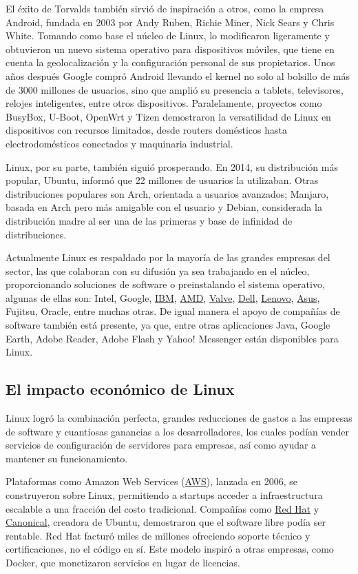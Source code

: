 \documentclass[a4paper,12pt]{article}
\begin{document}
El éxito de Torvalds también sirvió de inspiración a otros, como la empresa
Android, fundada en 2003 por Andy Ruben, Richie Miner, Nick Sears y Chris White.
Tomando como base el núcleo de Linux, lo modificaron ligeramente y obtuvieron un
nuevo sistema operativo para dispositivos móviles, que tiene en cuenta la
geolocalización y la configuración personal de sus propietarios. Unos años 
después Google compró Android llevando el kernel no solo al bolsillo de más de
3000 millones de usuarios, sino que amplió su presencia a tablets, televisores,
relojes inteligentes, entre otros dispositivos. Paralelamente, proyectos como
BusyBox, U-Boot, OpenWrt y Tizen demostraron la versatilidad de Linux en
dispositivos con recursos limitados, desde routers domésticos hasta 
electrodomésticos conectados y maquinaria industrial.

Linux, por su parte, también siguió prosperando. En 2014, su distribución más
popular, Ubuntu, informó que 22 millones de usuarios la utilizaban. Otras
distribuciones populares son Arch, orientada a usuarios avanzados; Manjaro,
basada en Arch pero más amigable con el usuario y Debian, considerada la 
distribución madre al ser una de las primeras y base de infinidad de
distribuciones. 

Actualmente Linux es respaldado por la mayoría de las grandes empresas del
sector, las que colaboran con su difusión ya sea trabajando en el núcleo,
proporcionando soluciones de software o preinstalando el sistema operativo,
algunas de ellas son: Intel, Google, \hyperlink{ibm}{IBM}, \hyperlink{amd}{AMD}, \hyperlink{valve}{Valve}, \hyperlink{dell}{Dell}, \hyperlink{lenovo}{Lenovo}, \hyperlink{asus}{Asus},
Fujitsu, Oracle, entre muchas otras. De igual manera el apoyo de compañías de
software también está presente, ya que, entre otras aplicaciones Java, Google
Earth, Adobe Reader, Adobe Flash y Yahoo! Messenger están disponibles para
Linux.  

\subsection{El impacto económico de Linux}

Linux logró la combinación perfecta, grandes reducciones de gastos a las
empresas de software y cuantiosas ganancias a los desarrolladores, los cuales
podían vender servicios de configuración de servidores para empresas, así como
ayudar a mantener su funcionamiento. 

Plataformas como Amazon Web Services (\hyperlink{aws}{AWS}), lanzada en 2006, se construyeron
sobre Linux, permitiendo a startups acceder a infraestructura escalable a una
fracción del costo tradicional. Compañías como \hyperlink{redhat}{Red Hat} y \hyperlink{canonical}{Canonical}, creadora de
Ubuntu, demostraron que el software libre podía ser rentable. Red Hat facturó
miles de millones ofreciendo soporte técnico y certificaciones, no el código en
sí. Este modelo inspiró a otras empresas, como Docker, que monetizaron servicios
en lugar de licencias.
\end{document}
